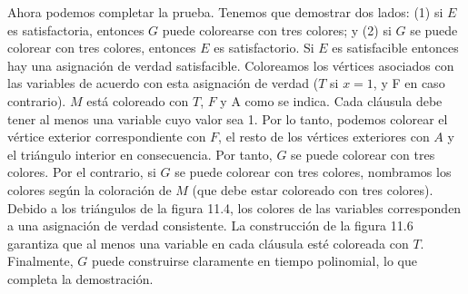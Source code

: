 Ahora podemos completar la prueba. Tenemos que demostrar dos lados: (1) si $E$ es satisfactoria, entonces 
$G$ puede colorearse con tres colores; y (2) si $G$ se puede colorear con tres colores, entonces $E$ es 
satisfactorio. Si $E$ es satisfacible entonces hay una asignación de verdad satisfacible. Coloreamos los 
vértices asociados con las variables de acuerdo con esta asignación de verdad ($T$ si $x =1$, y F en 
caso contrario). $M$ está coloreado con $T$, $F$ y A como se indica. Cada cláusula debe tener al menos una 
variable cuyo valor sea 1. Por lo tanto, podemos colorear el vértice exterior correspondiente con $F$, el 
resto de los vértices exteriores con $A$ y el triángulo interior en consecuencia. Por tanto, $G$ se puede 
colorear con tres colores. Por el contrario, si $G$ se puede colorear con tres colores, nombramos los 
colores según la coloración de $M$ (que debe estar coloreado con tres colores). Debido a los triángulos 
de la figura 11.4, los colores de las variables corresponden a una asignación de verdad consistente. 
La construcción de la figura 11.6 garantiza que al menos una variable en cada cláusula esté coloreada 
con $T$. Finalmente, $G$ puede construirse claramente en tiempo polinomial, lo que completa la demostración.
